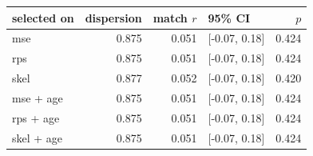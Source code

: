 
\begin{tabular}{lrrlr}
\toprule
selected on & dispersion & match $r$ & 95\% CI & $p$\\
\midrule
mse & 0.875 & 0.051 & {}[-0.07, 0.18] & 0.424\\
rps & 0.875 & 0.051 & {}[-0.07, 0.18] & 0.424\\
skel & 0.877 & 0.052 & {}[-0.07, 0.18] & 0.420\\
mse + age & 0.875 & 0.051 & {}[-0.07, 0.18] & 0.424\\
rps + age & 0.875 & 0.051 & {}[-0.07, 0.18] & 0.424\\
skel + age & 0.875 & 0.051 & {}[-0.07, 0.18] & 0.424\\
\bottomrule
\end{tabular}
